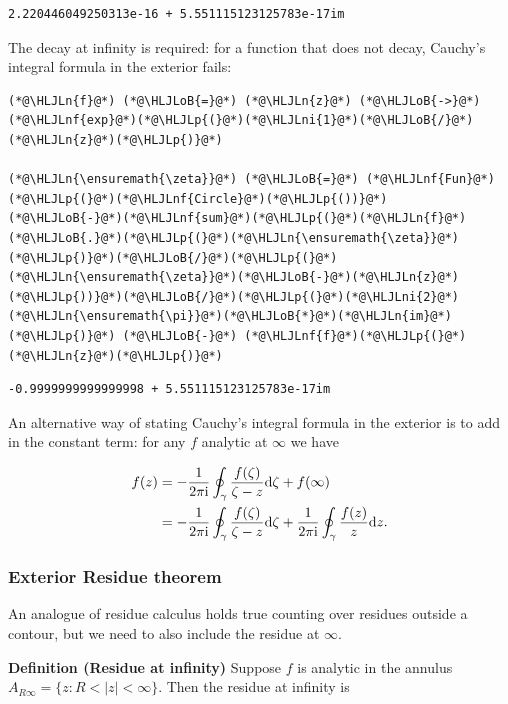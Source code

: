 \documentclass[12pt,a4paper]{article}
\newcommand{\HLJLn}[1]{#1}
\newcommand{\HLJLnf}[1]{\textcolor[RGB]{66,102,213}{#1}}
\newcommand{\HLJLni}[1]{\textcolor[RGB]{59,151,46}{#1}}
\newcommand{\HLJLoB}[1]{\textcolor[RGB]{102,102,102}{\textbf{#1}}}
\newcommand{\HLJLp}[1]{#1}
\def\D{ {\rm d} }
\def\I{ {\rm i} }
\begin{document}
\begin{lstlisting}
2.220446049250313e-16 + 5.551115123125783e-17im
\end{lstlisting}


The decay at infinity is required: for a function that does not decay, Cauchy's integral formula in the exterior fails:


\begin{lstlisting}
(*@\HLJLn{f}@*) (*@\HLJLoB{=}@*) (*@\HLJLn{z}@*) (*@\HLJLoB{->}@*) (*@\HLJLnf{exp}@*)(*@\HLJLp{(}@*)(*@\HLJLni{1}@*)(*@\HLJLoB{/}@*)(*@\HLJLn{z}@*)(*@\HLJLp{)}@*) 

(*@\HLJLn{\ensuremath{\zeta}}@*) (*@\HLJLoB{=}@*) (*@\HLJLnf{Fun}@*)(*@\HLJLp{(}@*)(*@\HLJLnf{Circle}@*)(*@\HLJLp{())}@*)
(*@\HLJLoB{-}@*)(*@\HLJLnf{sum}@*)(*@\HLJLp{(}@*)(*@\HLJLn{f}@*)(*@\HLJLoB{.}@*)(*@\HLJLp{(}@*)(*@\HLJLn{\ensuremath{\zeta}}@*)(*@\HLJLp{)}@*)(*@\HLJLoB{/}@*)(*@\HLJLp{(}@*)(*@\HLJLn{\ensuremath{\zeta}}@*)(*@\HLJLoB{-}@*)(*@\HLJLn{z}@*)(*@\HLJLp{))}@*)(*@\HLJLoB{/}@*)(*@\HLJLp{(}@*)(*@\HLJLni{2}@*)(*@\HLJLn{\ensuremath{\pi}}@*)(*@\HLJLoB{*}@*)(*@\HLJLn{im}@*)(*@\HLJLp{)}@*) (*@\HLJLoB{-}@*) (*@\HLJLnf{f}@*)(*@\HLJLp{(}@*)(*@\HLJLn{z}@*)(*@\HLJLp{)}@*)
\end{lstlisting}

\begin{lstlisting}
-0.9999999999999998 + 5.551115123125783e-17im
\end{lstlisting}


An alternative way of stating Cauchy's integral formula in the exterior is to add in the constant  term: for any $f$ analytic at $\infty$ we have 


\begin{align*}
f(z) &= -{1 \over 2 \pi \I} \oint_\gamma {f(\zeta) \over \zeta - z} \D \zeta  + f(\infty)  \\
    &= -{1 \over 2 \pi \I} \oint_\gamma {f(\zeta) \over \zeta - z} \D \zeta  + {1 \over 2 \pi \I} \oint_\gamma {f(z) \over z} \D z.
\end{align*}
\subsubsection{Exterior Residue theorem}
An analogue of residue calculus holds true counting over residues outside a contour, but we need to also include  the residue at $\infty$.

\textbf{Definition (Residue at infinity)} Suppose $f$ is analytic in the annulus $A_{R\infty} = \{z : R < |z| < \infty \}$. Then the residue at infinity is
\end{document}
